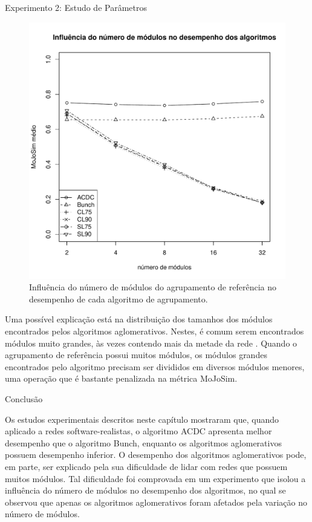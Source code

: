 \begin{section}{Experimento 2: Estudo de Parâmetros}
\begin{figure}[htbp]
	\centering
		\includegraphics[scale=0.5]{figuras/mojosim-vs-modules}
	\caption{Influência do número de módulos do agrupamento de referência no desempenho de cada algoritmo de agrupamento.}
	\label{fig:mojosim-vs-modules}
\end{figure}

Uma possível explicação está na distribuição dos tamanhos dos módulos encontrados pelos algoritmos aglomerativos. Nestes, é comum serem encontrados módulos muito grandes, às vezes contendo mais da metade da rede \cite{Wu2005}. Quando o agrupamento de referência possui muitos módulos, os módulos grandes encontrados pelo algoritmo precisam ser divididos em diversos módulos menores, uma operação que é bastante penalizada na métrica MoJoSim.


\end{section}

\begin{section}{Conclusão}

Os estudos experimentais descritos neste capítulo mostraram que, quando aplicado a redes software-realistas, o algoritmo ACDC apresenta melhor desempenho que o algoritmo Bunch, enquanto os algoritmos aglomerativos possuem desempenho inferior. O desempenho dos algoritmos aglomerativos pode, em parte, ser explicado pela sua dificuldade de lidar com redes que possuem muitos módulos. Tal dificuldade foi comprovada em um experimento que isolou a influência do número de módulos no desempenho dos algoritmos, no qual se observou que apenas os algoritmos aglomerativos foram afetados pela variação no número de módulos.

\end{section}
